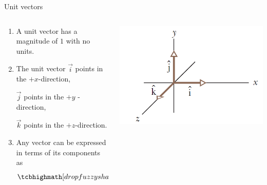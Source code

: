 \documentclass[18pt]{LectMechanics}
\begin{document}
\begin{frame}{Unit vectors}{}
	\begin{columns}
		\begin{column}{.4\linewidth}
			\begin{enumerate}
				\item  A unit vector has a magnitude
				      of $1$ with no units.
				\item The unit vector $\vec i$ points in the
				      $+x$-direction,

				      $\vec j$ points in the $+y$ - direction,

				      $\vec k$ points in the $+z$-direction.
				\item Any vector can be expressed in terms of its components as
				      \begin{equation*}
					      \tcbhighmath[drop fuzzy shadow]{\vec A = A_x\vec i + A_y\vec j + A_x \vec k}
				      \end{equation*}
			\end{enumerate}
		\end{column}
		\begin{column}{.4\linewidth}
			\begin{center}
				\includegraphics[width=\linewidth]{unit_vectors}
			\end{center}
		\end{column}
	\end{columns}
\end{frame}
\end{document}
